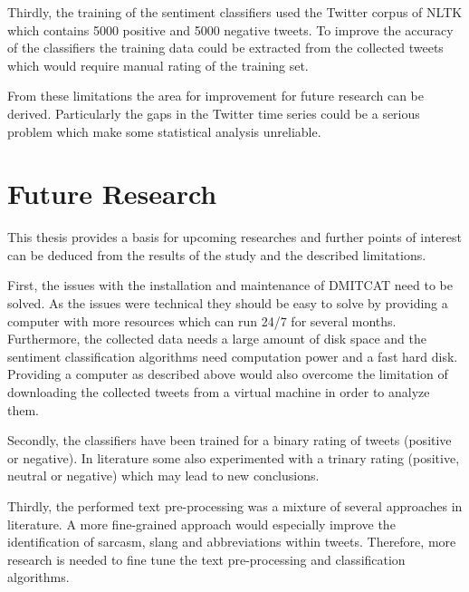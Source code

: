 Thirdly, the training of the sentiment classifiers used the Twitter corpus of \ac{NLTK} which contains 5000 positive and 5000 negative tweets.
To improve the accuracy of the classifiers the training data could be extracted from the collected tweets which would require manual rating of the training set.

From these limitations the area for improvement for future research can be derived.
Particularly the gaps in the Twitter time series could be a serious problem which make some statistical analysis unreliable.

\section{Future Research}
\label{s:conclusions-future}


This thesis provides a basis for upcoming researches and further points of interest can be deduced from the results of the study and the described limitations.

First, the issues with the installation and maintenance of \ac{DMITCAT} need to be solved.
As the issues were technical they should be easy to solve by providing a computer with more resources which can run 24/7 for several months.
Furthermore, the collected data needs a large amount of disk space and the sentiment classification algorithms need computation power and a fast hard disk.
Providing a computer as described above would also overcome the limitation of downloading the collected tweets from a virtual machine in order to analyze them.

Secondly, the classifiers have been trained for a binary rating of tweets (positive or negative).
In literature some also experimented with a trinary rating (positive, neutral or negative) which may lead to new conclusions.

Thirdly, the performed text pre-processing was a mixture of several approaches in literature.
A more fine-grained approach would especially improve the identification of sarcasm, slang and abbreviations within tweets.
Therefore, more research is needed to fine tune the text pre-processing and classification algorithms.